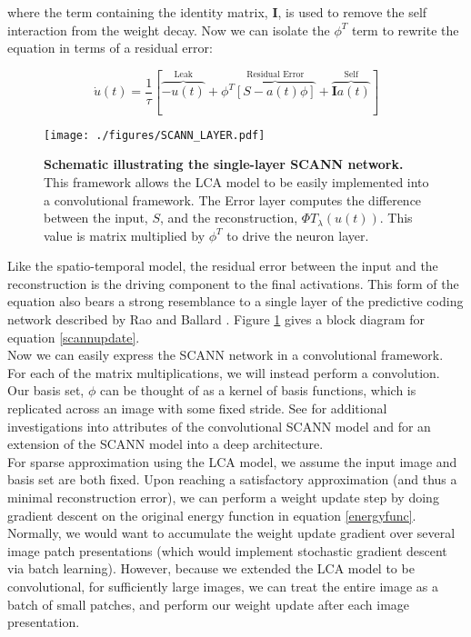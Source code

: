 \documentclass[smallextended]{svjour3}       %
\begin{document}
\noindent where the term containing the identity matrix, $\mathbf{I}$, is used to remove the self interaction from the weight decay. Now we can isolate the $\phi^T$ term to rewrite the equation in terms of a residual error:

\begin{equation}
    \dot{u}(t) =
        \frac{1}{\tau} \left[ \overbrace{ -u(t) }^\text{Leak}+
        \phi^T \overbrace{\left[
            S  - a(t) \phi \right] }^\text{Residual Error} +
        \overbrace{\mathbf{I}a(t)}^\text{Self} \right]
\label{scannupdate}
\end{equation}

\begin{figure}
\centering
    \texttt{[image: ./figures/SCANN\_LAYER.pdf]}
    \caption{\textbf{Schematic illustrating the single-layer SCANN network.} This framework allows the LCA model to be easily implemented into a convolutional framework. The Error layer computes the difference between the input, $S$, and the reconstruction, $\Phi T_{\lambda}(u(t))$. This value is matrix multiplied by $\phi^{T}$ to drive the neuron layer.}
\label{scannlayer}
\end{figure}

\noindent Like the spatio-temporal model, the residual error between the input and the reconstruction is the driving component to the final activations. This form of the equation also bears a strong resemblance to a single layer of the predictive coding network described by Rao and Ballard \cite{rao1999predictive}. Figure \ref{scannlayer} gives a block diagram for equation \ref{scannupdate}.\\

\noindent Now we can easily express the SCANN network in a convolutional framework. For each of the matrix multiplications, we will instead perform a convolution. Our basis set, $\phi$ can be thought of as a kernel of basis functions, which is replicated across an image with some fixed stride. See \cite{schultz2014replicating} for additional investigations into attributes of the convolutional SCANN model and \cite{paiton2015deconvolutional} for an extension of the SCANN model into a deep architecture.\\

\noindent For sparse approximation using the LCA model, we assume the input image and basis set are both fixed. Upon reaching a satisfactory approximation (and thus a minimal reconstruction error), we can perform a weight update step by doing gradient descent on the original energy function in equation \ref{energyfunc}. Normally, we would want to accumulate the weight update gradient over several image patch presentations (which would implement stochastic gradient descent via batch learning). However, because we extended the LCA model to be convolutional, for sufficiently large images, we can treat the entire image as a batch of small patches, and perform our weight update after each image presentation.
\end{document}
